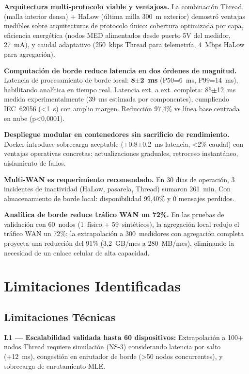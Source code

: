\textbf{Arquitectura multi-protocolo viable y ventajosa.} La combinación Thread (malla interior densa) + HaLow (última milla 300~m exterior) demostró ventajas medibles sobre arquitecturas de protocolo único: cobertura optimizada por capa, eficiencia energética (nodos MED alimentados desde puerto 5V del medidor, 27~mA), y caudal adaptativo (250~kbps Thread para telemetría, 4~Mbps HaLow para agregación).

\textbf{Computación de borde reduce latencia en dos órdenes de magnitud.} Latencia de procesamiento de borde local: \textbf{8$\pm$2~ms} (P50=6~ms, P99=14~ms), habilitando analítica en tiempo real. Latencia ext. a ext. completa: 85$\pm$12~ms medida experimentalmente (39~ms estimada por componentes), cumpliendo IEC~62056 (<1~s) con amplio margen. Reducción 97,4\% vs línea base centrada en nube (p<0,0001).

\textbf{Despliegue modular en contenedores sin sacrificio de rendimiento.} Docker introduce sobrecarga aceptable (+0,8$\pm$0,2~ms latencia, <2\% caudal) con ventajas operativas concretas: actualizaciones graduales, retroceso instantáneo, aislamiento de fallos.

\textbf{Multi-WAN es requerimiento recomendado.} En 30 días de operación, 3 incidentes de inactividad (HaLow, pasarela, Thread) sumaron 261~min. Con almacenamiento de borde local: disponibilidad 99,40\% y 0 mensajes perdidos.

\textbf{Analítica de borde reduce tráfico WAN un 72\%.} En las pruebas de validación con 60~nodos (1~físico + 59~sintéticos), la agregación local redujo el tráfico WAN un 72\%; la extrapolación a 300~medidores con agregación completa proyecta una reducción del 91\% (3,2~GB/mes a 280~MB/mes), eliminando la necesidad de un enlace celular de alta capacidad.

\section{Limitaciones Identificadas}

\subsection{Limitaciones Técnicas}

\textbf{L1 --- Escalabilidad validada hasta 60 dispositivos:} Extrapolación a 100+ nodos Thread requiere simulación (NS-3) considerando latencia por salto (+12~ms), congestión en enrutador de borde (>50 nodos concurrentes), y sobrecarga de enrutamiento MLE.

